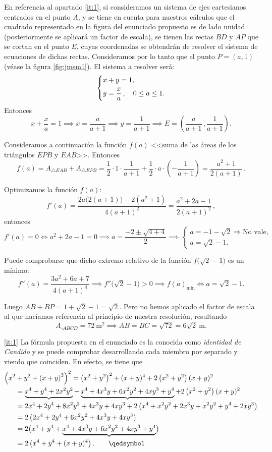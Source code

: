\documentclass[
	fecha={5 de agosto de 2025},
	palabrasclave={RetoSecundaria, ago2025, álgebra, dif1},
	codigo=minted
]{RetoMatematico}
\begin{document}
En referencia al apartado \ref{it:1}, si consideramos un sistema de ejes cartesianos centrados en el punto \(A\), y se tiene en cuenta para nuestros cálculos que el cuadrado representado en la figura del enunciado propuesto es de lado unidad (posteriormente se aplicará un factor de escala), se tienen las rectas \(BD\) y \(AP\) que se cortan en el punto \(E\), cuyas coordenadas se obtendrán de resolver el sistema de ecuaciones de dichas rectas. Consideramos por lo tanto que el punto \(P=(a,1)\) (véase la figura \ref{fig:jmsm1}). El sistema a resolver será:
\[
\begin{dcases}
	x+y=1,\\ y=\frac{x}{a}\,,\quad 0\leq a\leq 1.
\end{dcases}
\]
Entonces
\[
x+\frac{x}{a}=1\implies x=\frac{a}{a+1}\implies y=\frac{1}{a+1}\implies E=\left(\frac{a}{a+1}\,,\frac{1}{a+1}\right).
\]

Consideramos a continuación la función \(f(a)\) <<suma de las áreas de los triángulos \(EPB\) y \(EAB\)>>. Entonces
\[
f(a)=A_{\triangle EAB}+A_{\triangle EPB}=\frac{1}{2}\cdot 1\cdot \frac{1}{a+1}+\frac{1}{2}\cdot a\cdot\left(-\frac{1}{a+1}\right)=\frac{a^2+1}{2(a+1)}\,.
\]

Optimizamos la función \(f(a)\):
\[
f'(a)=\frac{2a\big(2(a+1)\big)-2(a^2+1)}{4(a+1)^2}=\frac{a^2+2a-1}{2(a+1)^2}\,,
\]
entonces
\[
f'(a)=0\iff a^2+2a-1=0\implies a=\frac{-2\pm\sqrt{4+4}}{2}\implies\begin{cases}a=-1-\sqrt{2}\Rightarrow\text{No vale},\\a=\sqrt{2}-1.\end{cases}
\]

Puede comprobarse que dicho extremo relativo de la función \(f\big(\sqrt{2}-1\big)\) es un mínimo:
\[
f''(a)=\frac{3a^2+6a+7}{4(a+1)^4}\implies f''\big(\sqrt{2}-1\big)>0\implies f(a)_{\text{mín}}\iff a=\sqrt{2}-1.
\]

Luego \(AB+BP=1+\sqrt{2}-1=\sqrt{2}\). Pero no hemos aplicado el factor de escala al que hacíamos referencia al principio de nuestra resolución, resultando
\[
A_{\square ABCD}=72\ \text{m}^2\implies AB=BC=\sqrt{72}=6\sqrt{2}\ \text{m}.
\]


\ref{it:1} La fórmula propuesta en el enunciado es la conocida como \emph{identidad de Candido} y se puede comprobar desarrollando cada miembro por separado y viendo que coinciden. En efecto, se tiene que
\begin{align*}
	\Bigl(x^2&+y^2+\l(x+y\r)^2\Bigr)^2 = \l(x^2 + y^2\r)^2 + (x+y)^4 + 2\l(x^2 + y^2\r)(x+y)^2\\
	&= \underbrace{x^4 + y^4 + 2x^2y^2}+\underbrace{x^4 + 4x^3y + 6x^2y^2 + 4xy^3 + y^4} + 2\l(x^2 + y^2\r)(x+y)^2\\
	&= 2x^4 + 2y^4 + 8x^2y^2 + 4x^3y + 4xy^3 + 2\l(x^4 + x^2y^2 + 2x^3 y + x^2 y^2 + y^4 + 2xy^3\r)\\
	&= 2\l(2x^4 + 2y^4 + 6x^2y^2 + 4x^3 y + 4xy^3\r)\\
	&= 2\bigl(x^4 + y^4 + \underbrace{x^4 + 4x^3 y + 6x^2y^2 + 4xy^3 + y^4}\bigr)\\
	&= 2\l(x^4 + y^4 + (x+y)^4\r). \tag*{\qedsymbol}
\end{align*}
\end{document}
